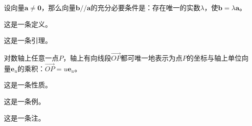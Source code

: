 \begin{theorem}
  设向量$\boldsymbol a\neq\boldsymbol 0$，那么向量$\boldsymbol b//\boldsymbol a$的充分必要条件是：存在唯一的实数$\lambda$，使$\boldsymbol b=\lambda \boldsymbol a$。
\end{theorem}
\begin{definition}
  这是一条定义。
\end{definition}
\begin{lemma}
  这是一条引理。
\end{lemma}
\begin{corollary}
  对数轴上任意一点$P$，轴上有向线段$\vec {OP}$都可唯一地表示为点$P$的坐标与轴上单位向量$\boldsymbol e_u$的乘积：$\vec {OP}=u \boldsymbol e_u$。
\end{corollary}
\begin{proposition}
  这是一条性质。
\end{proposition}
\begin{example}
  这是一条例。
\end{example}
\begin{remark}
  这是一条注。
\end{remark}
